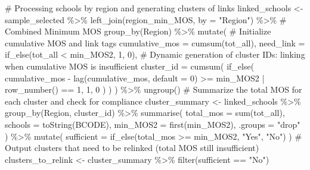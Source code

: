 \documentclass[
  12pt]{article}
\newenvironment{Shaded}{\begin{snugshade}}{\end{snugshade}}
\newcommand{\AttributeTok}[1]{\textcolor[rgb]{0.40,0.45,0.13}{#1}}
\newcommand{\CommentTok}[1]{\textcolor[rgb]{0.37,0.37,0.37}{#1}}
\newcommand{\DecValTok}[1]{\textcolor[rgb]{0.68,0.00,0.00}{#1}}
\newcommand{\FunctionTok}[1]{\textcolor[rgb]{0.28,0.35,0.67}{#1}}
\newcommand{\NormalTok}[1]{\textcolor[rgb]{0.00,0.23,0.31}{#1}}
\newcommand{\OtherTok}[1]{\textcolor[rgb]{0.00,0.23,0.31}{#1}}
\newcommand{\SpecialCharTok}[1]{\textcolor[rgb]{0.37,0.37,0.37}{#1}}
\newcommand{\StringTok}[1]{\textcolor[rgb]{0.13,0.47,0.30}{#1}}
\begin{document}
\begin{Shaded}
\begin{Highlighting}[]
\CommentTok{\# Processing schools by region and generating clusters of links}
\NormalTok{linked\_schools }\OtherTok{\textless{}{-}}\NormalTok{ sample\_selected }\SpecialCharTok{\%\textgreater{}\%}
  \FunctionTok{left\_join}\NormalTok{(region\_min\_MOS, }\AttributeTok{by =} \StringTok{"Region"}\NormalTok{) }\SpecialCharTok{\%\textgreater{}\%}  \CommentTok{\# Combined Minimum MOS}
  \FunctionTok{group\_by}\NormalTok{(Region) }\SpecialCharTok{\%\textgreater{}\%}
  \FunctionTok{mutate}\NormalTok{(}
    \CommentTok{\# Initialize cumulative MOS and link tags}
    \AttributeTok{cumulative\_mos =} \FunctionTok{cumsum}\NormalTok{(tot\_all),}
    \AttributeTok{need\_link =} \FunctionTok{if\_else}\NormalTok{(tot\_all }\SpecialCharTok{\textless{}}\NormalTok{ min\_MOS2, }\DecValTok{1}\NormalTok{, }\DecValTok{0}\NormalTok{),}
    \CommentTok{\# Dynamic generation of cluster IDs: linking when cumulative MOS is insufficient}
    \AttributeTok{cluster\_id =} \FunctionTok{cumsum}\NormalTok{(}
      \FunctionTok{if\_else}\NormalTok{(}
\NormalTok{        cumulative\_mos }\SpecialCharTok{{-}} \FunctionTok{lag}\NormalTok{(cumulative\_mos, }\AttributeTok{default =} \DecValTok{0}\NormalTok{) }\SpecialCharTok{\textgreater{}=}\NormalTok{ min\_MOS2 }\SpecialCharTok{|} \FunctionTok{row\_number}\NormalTok{() }\SpecialCharTok{==} \DecValTok{1}\NormalTok{,}
        \DecValTok{1}\NormalTok{, }\DecValTok{0}
\NormalTok{      )}
\NormalTok{    )}
\NormalTok{  ) }\SpecialCharTok{\%\textgreater{}\%}
  \FunctionTok{ungroup}\NormalTok{()}
\CommentTok{\# Summarize the total MOS for each cluster and check for compliance}
\NormalTok{cluster\_summary }\OtherTok{\textless{}{-}}\NormalTok{ linked\_schools }\SpecialCharTok{\%\textgreater{}\%}
  \FunctionTok{group\_by}\NormalTok{(Region, cluster\_id) }\SpecialCharTok{\%\textgreater{}\%}
  \FunctionTok{summarise}\NormalTok{(}
    \AttributeTok{total\_mos =} \FunctionTok{sum}\NormalTok{(tot\_all),}
    \AttributeTok{schools =} \FunctionTok{toString}\NormalTok{(BCODE),}
    \AttributeTok{min\_MOS2 =} \FunctionTok{first}\NormalTok{(min\_MOS2),}
    \AttributeTok{.groups =} \StringTok{"drop"}
\NormalTok{  ) }\SpecialCharTok{\%\textgreater{}\%}
  \FunctionTok{mutate}\NormalTok{(}
    \AttributeTok{sufficient =} \FunctionTok{if\_else}\NormalTok{(total\_mos }\SpecialCharTok{\textgreater{}=}\NormalTok{ min\_MOS2, }\StringTok{"Yes"}\NormalTok{, }\StringTok{"No"}\NormalTok{)}
\NormalTok{  )}
\CommentTok{\# Output clusters that need to be relinked (total MOS still insufficient)}
\NormalTok{clusters\_to\_relink }\OtherTok{\textless{}{-}}\NormalTok{ cluster\_summary }\SpecialCharTok{\%\textgreater{}\%} \FunctionTok{filter}\NormalTok{(sufficient }\SpecialCharTok{==} \StringTok{"No"}\NormalTok{)}


\end{Highlighting}
\end{Shaded}
\end{document}
